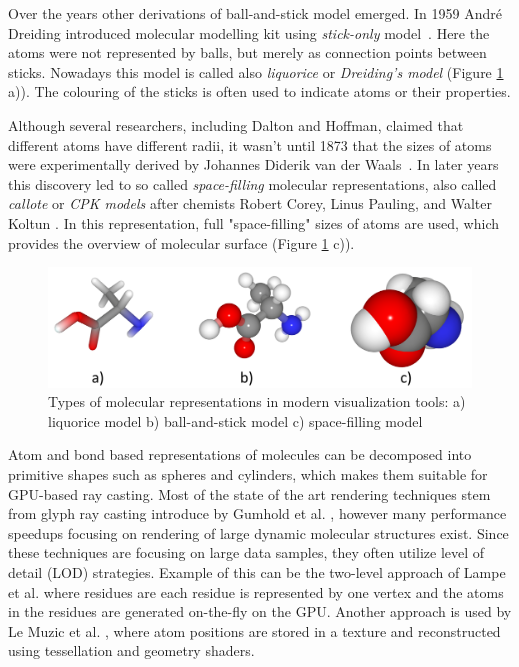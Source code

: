 Over the years other derivations of ball-and-stick model emerged. In 1959 André Dreiding introduced molecular modelling kit using \textit{stick-only} model~\cite{dreiding1959einfache}. Here the atoms were not represented by balls, but merely as connection points between sticks. Nowadays this model is called also \textit{liquorice} or \textit{Dreiding's model} (Figure \ref{Fig:vis} a)). The colouring of the sticks is often used to indicate atoms or their properties.

Although several researchers, including Dalton and Hoffman, claimed that different atoms have different radii, it wasn't until 1873 that the sizes of atoms were experimentally derived by Johannes Diderik van der Waals~\cite{Waals1873PhDThesis}. In later years this discovery led to so called \textit{space-filling} molecular representations, also called \textit{callote} or \textit{CPK models} after chemists Robert Corey, Linus Pauling, and Walter Koltun \cite{corey1953molecular}. In this representation, full "space-filling" sizes of atoms are used, which provides the overview of molecular surface (Figure \ref{Fig:vis} c)).

\begin{figure}[H]
  \centering
  \includegraphics[width=\linewidth]{pictures/vis.pdf} 
  \caption{Types of molecular representations in modern visualization tools: a) liquorice model b) ball-and-stick model c) space-filling model}
  \label{Fig:vis}  
\end{figure} 

Atom and bond based representations of molecules can be decomposed into primitive shapes such as spheres and cylinders, which makes them suitable for GPU-based ray casting. Most of the state of the art rendering techniques stem from glyph ray casting introduce by Gumhold et al. \cite{gumhold2003splatting}, however many performance speedups focusing on rendering of large dynamic molecular structures exist. Since these techniques are focusing on large data samples, they often utilize level of detail (LOD) strategies. Example of this can be the two-level approach of Lampe et al. \cite{lampe2007two} where residues are each residue is represented by one vertex and the atoms in the residues are generated on-the-fly on the GPU. Another approach is used by Le Muzic et al. \cite{le2014illustrative}, where atom positions are stored in a texture and reconstructed using tessellation and geometry shaders.

